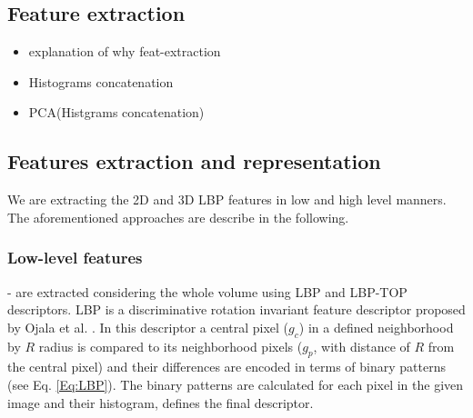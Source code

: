 \subsection{Feature extraction}
\begin{itemize}
  \item explanation of why feat-extraction
  \item Histograms concatenation
  \item PCA(Histgrams concatenation)
\end{itemize}

\color{blue}



\subsection{Features extraction and representation}
We are extracting the 2D and 3D LBP features in low and high level manners. The aforementioned approaches are describe in the following.


\subsubsection{Low-level features} - are extracted considering the whole volume using LBP and LBP-TOP descriptors. LBP is a discriminative rotation invariant feature descriptor proposed by Ojala et al. \cite{ojala2002multiresolution}. In this descriptor a central pixel ($g_c$) in a defined neighborhood by $R$ radius is compared to its neighborhood pixels ($g_{p}$, with distance of $R$ from the central pixel) and their differences are encoded in terms of binary patterns (see Eq. \ref{Eq:LBP}). The binary patterns are calculated for each pixel in the given image and their histogram, defines the final descriptor.

